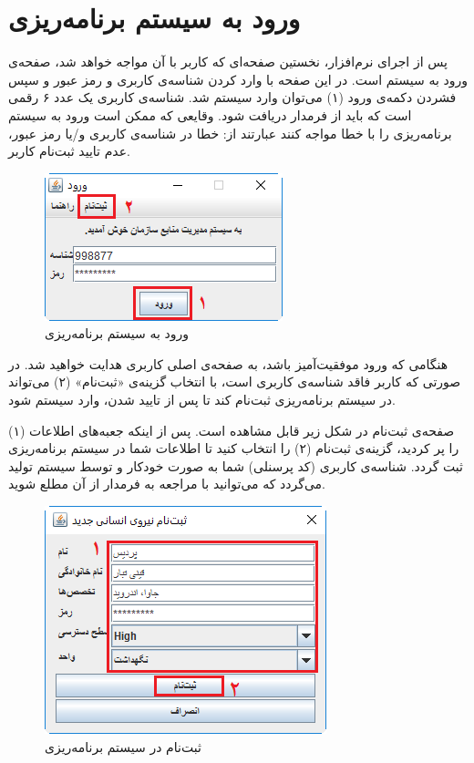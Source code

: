 \newpage
\section{ورود به سیستم برنامه‌ریزی}
پس از اجرای نرم‌افزار، نخستین صفحه‌ای که کاربر با آن مواجه خواهد شد، صفحه‌ی ورود به سیستم است. در این صفحه با وارد کردن شناسه‌ی کاربری و رمز عبور و سپس فشردن دکمه‌ی ورود  (۱) می‌توان وارد سیستم شد. شناسه‌ی کاربری یک عدد ۶ رقمی است که باید از فرمدار دریافت شود. وقایعی که ممکن است ورود به سیستم برنامه‌ریزی را با خطا مواجه کنند عبارتند از: خطا در شناسه‌ی کاربری و/یا رمز عبور، عدم تایید ثبت‌نام کاربر.
	\begin{figure}[H]
		\centering
		\includegraphics[scale=0.8]{img/manual/login}
		\caption{ورود به سیستم برنامه‌ریزی}
	\end{figure}

هنگامی که ورود موفقیت‌آمیز باشد، به صفحه‌ی اصلی کاربری هدایت خواهید شد. در صورتی که کاربر فاقد شناسه‌ی کاربری است، با انتخاب گزینه‌ی «ثبت‌نام»   (۲) می‌تواند در سیستم برنامه‌ریزی ثبت‌نام کند تا پس از تایید شدن، وارد سیستم شود.

صفحه‌ی ثبت‌نام در شکل زیر قابل مشاهده است. پس از اینکه جعبه‌های اطلاعات (۱) را پر کردید، گزینه‌ی ثبت‌نام (۲) را انتخاب کنید تا اطلاعات شما در سیستم برنامه‌ریزی ثبت گردد. شناسه‌ی کاربری (کد پرسنلی) شما به صورت خودکار و توسط سیستم تولید می‌گردد که می‌توانید با مراجعه به فرمدار
از آن مطلع شوید.

	\begin{figure}[H]
		\centering
		\includegraphics[scale=0.8]{img/manual/register}
		\caption{ثبت‌نام در سیستم برنامه‌ریزی}
	\end{figure}


